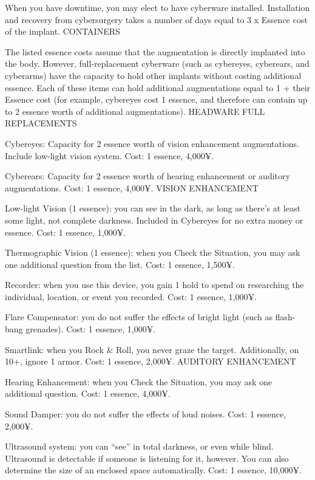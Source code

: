 When you have downtime, you may elect to have cyberware installed. Installation and recovery from cybersurgery takes a number of days equal to 3 x Essence cost of the implant.
CONTAINERS

The listed essence costs assume that the augmentation is directly implanted into the body. However, full-replacement cyberware (such as cybereyes, cyberears, and cyberarms) have the capacity to hold other implants without costing additional essence. Each of these items can hold additional augmentations equal to 1 + their Essence cost (for example, cybereyes cost 1 essence, and therefore can contain up to 2 essence worth of additional augmentations).
HEADWARE
FULL REPLACEMENTS

Cybereyes: Capacity for 2 essence worth of vision enhancement augmentations. Include low-light vision system. Cost: 1 essence, 4,000¥.

Cyberears: Capacity for 2 essence worth of hearing enhancement or auditory augmentations. Cost: 1 essence, 4,000¥.
VISION ENHANCEMENT

Low-light Vision (1 essence): you can see in the dark, as long as there’s at least some light, not complete darkness. Included in Cybereyes for no extra money or essence. Cost: 1 essence, 1,000¥.

Thermographic Vision (1 essence): when you Check the Situation, you may ask one additional question from the list. Cost: 1 essence, 1,500¥.

Recorder: when you use this device, you gain 1 hold to spend on researching the individual, location, or event you recorded. Cost: 1 essence, 1,000¥.

Flare Compensator: you do not suffer the effects of bright light (such as flash-bang grenades). Cost: 1 essence, 1,000¥.

Smartlink: when you Rock \& Roll, you never graze the target. Additionally, on 10+, ignore 1 armor. Cost: 1 essence, 2,000¥.
AUDITORY ENHANCEMENT

Hearing Enhancement: when you Check the Situation, you may ask one additional question. Cost: 1 essence, 4,000¥.

Sound Damper: you do not suffer the effects of loud noises. Cost: 1 essence, 2,000¥.

Ultrasound system: you can “see” in total darkness, or even while blind. Ultrasound is detectable if someone is listening for it, however. You can also determine the size of an enclosed space automatically. Cost: 1 essence, 10,000¥.

